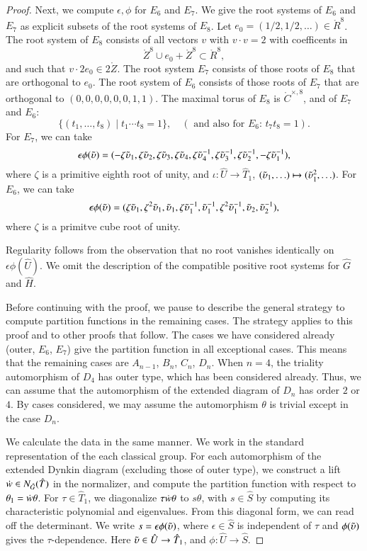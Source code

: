 \begin{proof}
Next, we compute $\epsilon,\phi$ for $E_6$ and $E_7$.  We give the
root systems of $E_6$ and $E_7$ as explicit subsets of the root
systems of $E_8$.  Let $e_0=(1/2,1/2,\ldots)\in\ring{R}^8$.  The root
system of $E_8$ consists of all vectors $v$ with $v\cdot v = 2$ with
coefficents in
\[
\ring{Z}^8 \cup e_0 + \ring{Z}^8 \subset \ring{R}^8,
\]
and such that $v\cdot 2 e_0 \in2\ring{Z}$.  The root system $E_7$
consists of those roots of $E_8$ that are orthogonal to $e_0$.  The
root system of $E_6$ consists of those roots of $E_7$ that are
orthogonal to $(0,0,0,0,0,0,1,1)$.
The maximal torus of $E_8$ is $\ring{C}^{\times,8}$, and of $E_7$ and $E_6$:
\[
\{(t_1,\ldots,t_8)\mid t_1\cdots t_8 = 1\},\quad (\text{ and also for $E_6$: } t_7 t_8 = 1).
\]
For $E_7$, we can take
\[
\epsilon\phi(\tilde\upsilon) = (-\zeta\tilde\upsilon_1,\zeta\tilde\upsilon_2,\zeta\tilde\upsilon_3,\zeta\tilde\upsilon_4,
\zeta\tilde\upsilon_4^{-1},\zeta\tilde\upsilon_3^{-1},\zeta\tilde\upsilon_2^{-1},-\zeta\tilde\upsilon_1^{-1}),
\]
where $\zeta$ is a primitive eighth root of unity, and $\iota:\hat U\to\hat T_1$, $(\tilde\upsilon_1,\ldots)\mapsto (\tilde\upsilon_1^2,\ldots)$.
For $E_6$, we can take
\[
\epsilon\phi(\tilde\upsilon) = (\zeta \tilde\upsilon_1,\zeta^2 \tilde\upsilon_1,\tilde\upsilon_1,\zeta\tilde\upsilon_1^{-1},\tilde\upsilon_1^{-1},
\zeta^2\tilde\upsilon_1^{-1},\tilde\upsilon_2,\tilde\upsilon_2^{-1}),
\]
where $\zeta$ is a primitve cube root of unity.

Regularity follows from the observation that no root vanishes identically on
$\epsilon\phi(\hat U)$.
We omit the description of the compatible positive root systems for $\hat G$ and
$\hat H$.


Before continuing with the proof, we pause to describe the general
strategy to compute partition functions in the remaining cases.  The
strategy applies to this proof and to other proofs that follow.  The
cases we have considered already (outer, $E_6$, $E_7$) give the
partition function in all exceptional cases.  This means that the
remaining cases are $A_{n-1}$, $B_n$, $C_n$, $D_n$.  When $n=4$, the
triality automorphism of $D_4$ has outer type, which has been
considered already.  Thus, we can assume that the automorphism of the
extended diagram of $D_n$ has order $2$ or $4$.  By cases considered,
we may assume the automorphism $\theta$ is trivial except in the case
$D_n$.

We calculate the data in the same manner.  We work in the standard
representation of the each classical group.  For each automorphism of
the extended Dynkin diagram (excluding those of outer type), we
construct a lift $\dot w \in N_{\hat G}(\hat T)$ in the normalizer, and
compute the partition function with respect to $\theta_1=\dot w
\theta$.  For $\tau\in \hat T_1$, we diagonalize $\tau\dot w\theta$ to
$s\theta$, with $s\in\hat S$ by computing its characteristic
polynomial and eigenvalues.  From this diagonal form, we can read off
the determinant.    We write $s = \epsilon
\phi(\tilde\upsilon)$, where $\epsilon \in \hat S$ is independent of $\tau$ and
$\phi(\tilde\upsilon)$ gives the $\tau$-dependence.  Here $\tilde\upsilon\in\hat U\to \hat
T_1$, and $\phi:\hat U\to \hat S$.



\end{proof}
